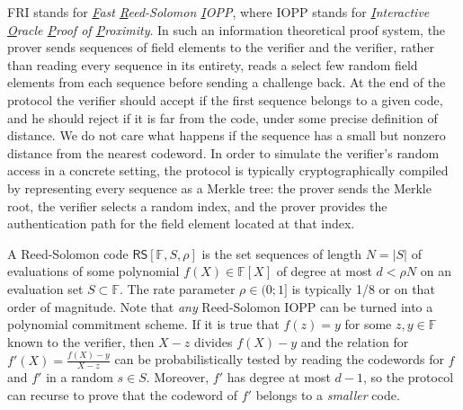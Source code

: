 FRI stands for \emph{\underline{F}ast \underline{R}eed-Solomon \underline{I}OPP}, where IOPP stands for \emph{\underline{I}nteractive \underline{O}racle \underline{P}roof of \underline{P}roximity}. In such an information theoretical proof system, the prover sends sequences of field elements to the verifier and the verifier, rather than reading every sequence in its entirety, reads a select few random field elements from each sequence before sending a challenge back. At the end of the protocol the verifier should accept if the first sequence belongs to a given code, and he should reject if it is far from the code, under some precise definition of distance. We do not care what happens if the sequence has a small but nonzero distance from the nearest codeword. In order to simulate the verifier's random access in a concrete setting, the protocol is typically cryptographically compiled by representing every sequence as a Merkle tree: the prover sends the Merkle root, the verifier selects a random index, and the prover provides the authentication path for the field element located at that index.

A Reed-Solomon code $\mathsf{RS}[\mathbb{F}, S, \rho]$ is the set sequences of length $N = |S|$ of evaluations of some polynomial $f(X) \in \mathbb{F}[X]$ of degree at most $d < \rho N$ on an evaluation set $S \subset \mathbb{F}$. The rate parameter $\rho \in (0; 1]$ is typically 1/8 or on that order of magnitude. Note that \emph{any} Reed-Solomon IOPP can be turned into a polynomial commitment scheme. If it is true that $f(z) = y$ for some $z,y \in \mathbb{F}$ known to the verifier, then $X-z$ divides $f(X)-y$ and the relation for $f'(X) = \frac{f(X)-y}{X-z}$ can be probabilistically tested by reading the codewords for $f$ and $f'$ in a random $s \in S$. Moreover, $f'$ has degree at most $d-1$, so the protocol can recurse to prove that the codeword of $f'$ belongs to a \emph{smaller} code.

